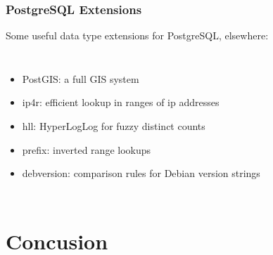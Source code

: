 \documentclass[xcolor=dvipsnames]{beamer}
\begin{document}
{
 
  \begin{frame}
    \frametitle{PostgreSQL Extensions}

    Some useful data type extensions for PostgreSQL, elsewhere:

    \vfill

    \begin{columns}[c]
      \begin{itemize}
      \item PostGIS: a full GIS system
      \item ip4r: efficient lookup in ranges of ip addresses
      \item hll: HyperLogLog for fuzzy distinct counts
      \item prefix: inverted range lookups
      \item debversion: comparison rules for Debian version strings
      \end{itemize}
    \end{columns}    
  \end{frame}
}


\section{Concusion}
\end{document}
